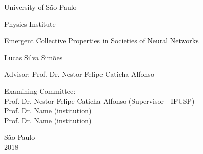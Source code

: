 
\pagestyle{empty}

\begin{center}
{\fontsize{16}{16} \selectfont University of São Paulo \\}

\vspace{0.1cm}

{\fontsize{16}{16} \selectfont Physics Institute}

\vspace{3.3cm}

{\fontsize{22}{22}\selectfont Emergent Collective Properties in Societies of Neural Networks \par}

\vspace{2cm}

{\fontsize{18}{18}\selectfont Lucas Silva Simões \par}

\vspace{2cm}

\end{center}

\leftskip 4cm

\begin{flushright}
\leftskip 4cm
Advisor: Prof. Dr. Nestor Felipe Caticha Alfonso
\end{flushright}

\vspace{0.8cm}

\par
\leftskip 4cm

\par

\leftskip 0cm

\vskip 1.5cm

\noindent Examining Committee: \\
\noindent Prof. Dr. Nestor Felipe Caticha Alfonso (Supervisor - IFUSP)\\
Prof. Dr. Name (institution)\\
Prof. Dr. Name (institution)\\
\vspace{1.cm}

\begin{center}
	São Paulo \\ 2018
\end{center}


